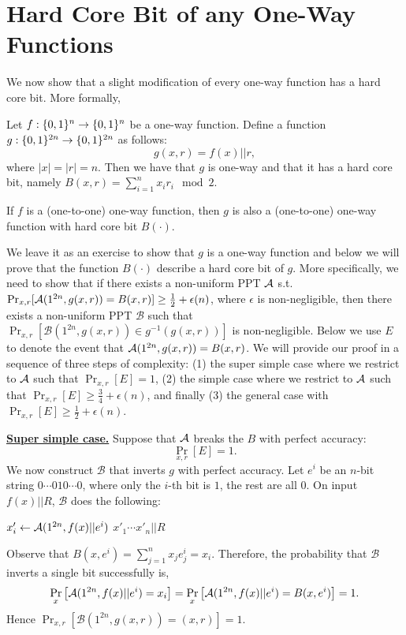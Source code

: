 \section{Hard Core Bit of any One-Way Functions}
We now show that a slight modification of every one-way function has a hard core bit. More formally,
\begin{theorem}\label{thm:hard-core-bit}
Let  $f:\{ 0, 1 \}^{n} \rightarrow \{ 0, 1 \}^{n}$ be a one-way function.
Define a function $g:\{ 0, 1 \}^{2n} \rightarrow \{ 0, 1 \}^{2n}$ as follows:
$$g(x,r) = f(x) || r,$$
where $|x| = |r| =n$. Then we have that $g$ is one-way and that it has a hard core bit, namely $B(x, r) = \sum_{i=1}^n x_i r_i\mod 2$.
\end{theorem}
\begin{remark}
If $f$ is a (one-to-one) one-way function, then $g$ is also a (one-to-one) one-way function with hard core bit $B(\cdot)$.
\end{remark}
\proof
We leave it as an exercise to show that $g$ is a one-way function and below we will prove that the function $B(\cdot)$ describe a hard core bit of $g$. More specifically, we need to show that if there exists a non-uniform PPT  ${\mathcal A}$ s.t. $\Pr_{x,r}[{\mathcal A}(1^{2n},g(x,r)) = B(x,r)] \ge \frac{1}{2} + \epsilon(n)$, where $\epsilon$ is non-negligible, then there exists a non-uniform PPT $\mathcal{B}$ such that $\Pr_{x,r}[\mathcal{B}(1^{2n}, g(x,r)) \in g^{-1}(g(x,r))]$ is non-negligible. Below we use $E$ to denote the event that ${\mathcal A}(1^{2n},g(x,r)) = B(x,r)$. We will provide our proof in a sequence of three steps of complexity: (1) the super simple case where we restrict to ${\mathcal A}$ such that $\Pr_{x,r}[E] = 1$, (2) the simple case where we restrict to ${\mathcal A}$ such that $\Pr_{x,r}[E] \geq \frac34 + \epsilon(n)$, and finally (3) the general case with $\Pr_{x,r}[E] \geq \frac12 + \epsilon(n)$.

\medskip
\noindent\textbf{\underline{Super simple case.}}
Suppose that ${\mathcal A}$ breaks the $B$ with perfect accuracy:
$$\Pr_{x,r}[E] =1.$$
We  now construct $\mathcal{B}$ that inverts $g$ with perfect accuracy.
Let $e^i$ be an $n$-bit string $0\cdots 0 1 0 \cdots0$, where only the $i$-th bit is $1$, the rest are all $0$.
On input $f(x)||R$, $\mathcal{B}$ does the following:

\medskip
\begin{algorithmic}
    \State $x'_i \gets {\mathcal A}(1^{2n}, f(x)||e^i)$
\EndFor
\State \Return $x'_1\cdots x'_n || R$
\end{algorithmic}
Observe that $B(x,e^i) = \sum_{j=1}^n x_je^i_j = x_i$. Therefore, the probability that $\mathcal{B}$ inverts a single bit successfully is,
$$\Pr_{x}\left[{\mathcal A}(1^{2n}, f(x)||e^i)=x_i\right] =  \Pr_{x}\left[{\mathcal A}(1^{2n}, f(x)||e^i)=B(x,e^i)\right] = 1.$$
Hence $\Pr_{x,r}[\mathcal{B}(1^{2n}, g(x,r)) = (x,r)] = 1$.


